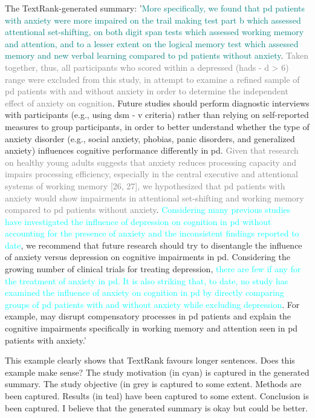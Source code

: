 \documentclass[11pt]{article}
\begin{document}
The TextRank-generated summary: '\textcolor{teal}{More specifically, we found that pd patients with anxiety were more impaired on the trail making test part b which assessed attentional set-shifting, on both digit span tests which assessed working memory and attention, and to a lesser extent on the logical memory test which assessed memory and new verbal learning compared to pd patients without anxiety}. \textcolor{gray}{Taken together, thus, all participants who scored within a  depressed  (hads - d > 6) range were excluded from this study, in attempt to examine a refined sample of pd patients with and without anxiety in order to determine the independent effect of anxiety on cognition}. Future studies should perform diagnostic interviews with participants (e.g., using dsm - v criteria) rather than relying on self-reported measures to group participants, in order to better understand whether the type of anxiety disorder (e.g., social anxiety, phobias, panic disorders, and generalized anxiety) influences cognitive performance differently in pd. \textcolor{gray}{Given that research on healthy young adults suggests that anxiety reduces processing capacity and impairs processing efficiency, especially in the central executive and attentional systems of working memory [26, 27], we hypothesized that pd patients with anxiety would show impairments in attentional set-shifting and working memory compared to pd patients without anxiety}. \textcolor{cyan}{Considering many previous studies have investigated the influence of depression on cognition in pd without accounting for the presence of anxiety and the inconsistent findings reported to date}, we recommend that future research should try to disentangle the influence of anxiety versus depression on cognitive impairments in pd. Considering the growing number of clinical trials for treating depression, \textcolor{cyan}{there are few if any for the treatment of anxiety in pd. It is also striking that, to date, no study has examined the influence of anxiety on cognition in pd by directly comparing groups of pd patients with and without anxiety while excluding depression}. For example, may disrupt compensatory processes in pd patients and explain the cognitive impairments specifically in working memory and attention seen in pd patients with anxiety.'

This example clearly shows that TextRank favours longer sentences. Does this example make sense? The study motivation (in cyan) is captured in the generated summary. The study objective (in grey  is captured to some extent. Methods are been captured. Results (in teal) have been captured to some extent. Conclusion is been captured. I believe that the generated summary is okay but could be better.
\end{document}
